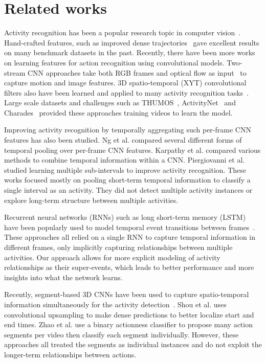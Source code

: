 \documentclass[10pt,twocolumn,letterpaper]{article}
\begin{document}
\section{Related works}

Activity recognition has been a popular research topic in computer vision~\cite{aggarwal11}. Hand-crafted features, such as improved dense trajectories~\cite{wang2011action} gave excellent results on many benchmark datasets in the past. Recently, there have been more works on learning features for action recognition using convolutional models. Two-stream CNN approaches take both RGB frames and optical flow as input~\cite{simonyan2014two} to capture motion and image features. 3D spatio-temporal (XYT) convolutional filters also have been learned and applied to many activity recognition tasks~\cite{tran2014c3d, carreira2017quo}. Large scale datasets and challenges such as THUMOS~\cite{THUMOS14}, ActivityNet~\cite{caba2015activitynet} and Charades~\cite{sigurdsson2016hollywood} provided these approaches training videos to learn the model.



Improving activity recognition by temporally aggregating such per-frame CNN features has also been studied. Ng et al. \cite{ng2015beyond} compared several different forms of temporal pooling over per-frame CNN features. Karpathy et al. \cite{karpathy2014large} compared various methods to combine temporal information within a CNN. Piergiovanni et al. \cite{piergiovanni2017learning} studied learning multiple sub-intervals to improve activity recognition. These works focused mostly on pooling short-term temporal information to classify a single interval as an activity. They did not detect multiple activity instances or explore long-term structure between multiple activities. 

Recurrent neural networks (RNNs) such as long short-term memory (LSTM) have been popularly used to model temporal event transitions between frames~\cite{yeung2016end,escorcia2016daps,yeung2015every}. These approaches all relied on a single RNN to capture temporal information in different frames, only implicitly capturing relationships between multiple activities. Our approach allows for more explicit modeling of activity relationships as their super-events, which leads to better performance and more insights into what the network learns.


Recently, segment-based 3D CNNs have been used to capture spatio-temporal information simultaneously for the activity detection~\cite{shou2016temporal,xu2017r}. Shou et al. \cite{shou2017cdc} uses convolutional upsampling to make dense predictions to better localize start and end times. Zhao et al. \cite{zhao2017temporal} use a binary actionness classifier to propose many action segments per video then classify each segment individually. However, these approaches all treated the segments as individual instances and do not exploit the longer-term relationships between actions.
\end{document}
